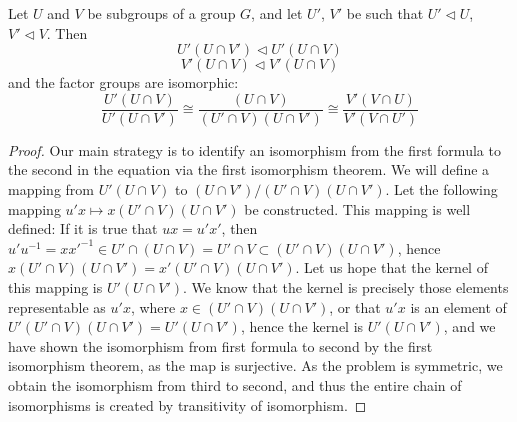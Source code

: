%

\begin{theorem}  
    Let $U$ and $V$ be subgroups of a group $G$, and let $U'$, $V'$ be such that $U' \lhd U$, $V' \lhd V$. Then
    \[ U'(U \cap V') \lhd U'(U \cap V) \]
    \[ V'(U \cap V) \lhd V'(U \cap V) \]
    and the factor groups are isomorphic:
    \[ \frac{U'(U \cap V)}{U'(U \cap V')} \cong \frac{(U \cap V)}{(U' \cap V)(U \cap V')} \cong \frac{V'(V \cap U)}{V'(V \cap U')} \]
\end{theorem}
\begin{proof}
    Our main strategy is to identify an isomorphism from the first formula to the second in the equation via the first isomorphism theorem. We will define a mapping from $U'(U \cap V)$ to $(U \cap V')/(U' \cap V)(U \cap V')$. Let the following mapping $u'x \mapsto x(U' \cap V)(U \cap V')$ be constructed. This mapping is well defined: If it is true that $ux = u'x'$, then $u'u^{-1} = xx'^{-1} \in U' \cap (U \cap V) = U' \cap V \subset (U' \cap V)(U \cap V')$, hence $x(U' \cap V)(U \cap V') = x'(U' \cap V)(U \cap V')$. Let us hope that the kernel of this mapping is $U'(U \cap V')$. We know that the kernel is precisely those elements representable as $u'x$, where $x \in (U' \cap V)(U \cap V')$, or that $u'x$ is an element of $U'(U' \cap V)(U \cap V') = U'(U \cap V')$, hence the kernel is $U'(U \cap V')$, and we have shown the isomorphism from first formula to second by the first isomorphism theorem, as the map is surjective. As the problem is symmetric, we obtain the isomorphism from third to second, and thus the entire chain of isomorphisms is created by transitivity of isomorphism.
\end{proof}

